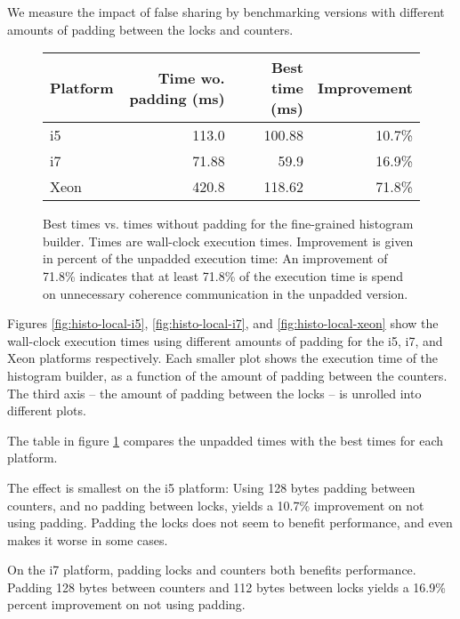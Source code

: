 We measure the impact of false sharing by benchmarking versions with different
amounts of padding between the locks and counters.


\begin{figure}[hbtp]
	\centering
	\begin{tabular}{l r r r}
		\hline
		\hline
		Platform & Time wo. padding (ms) & Best time (ms) & Improvement \\
		\hline
		i5 & 113.0 & 100.88 & 10.7\% \\
		i7 & 71.88 & 59.9 & 16.9\% \\
		Xeon & 420.8 & 118.62 & 71.8\% \\
		\hline
		\hline
	\end{tabular}
	\caption{Best times vs. times without padding for the fine-grained
	histogram builder. Times are wall-clock execution times. Improvement is
	given in percent of the unpadded execution time: An improvement of
	71.8\% indicates that at least 71.8\% of the execution time is spend on
	unnecessary coherence communication in the unpadded version.}
	\label{table:hist-local}
\end{figure}

Figures \ref{fig:histo-local-i5}, \ref{fig:histo-local-i7}, and
\ref{fig:histo-local-xeon} show the wall-clock execution times using different
amounts of padding for the i5, i7, and Xeon platforms respectively. Each smaller
plot shows the execution time of the histogram builder, as a function of the
amount of padding between the counters. The third axis -- the amount of padding
between the locks -- is unrolled into different plots.

The table in figure \ref{table:hist-local} compares the unpadded times with the
best times for each platform.

The effect is smallest on the i5 platform: Using 128 bytes padding between
counters, and no padding between locks, yields a 10.7\% improvement on not using
padding. Padding the locks does not seem to benefit performance, and even makes
it worse in some cases.

On the i7 platform, padding locks and counters both benefits performance.
Padding 128 bytes between counters and 112 bytes between locks yields a 16.9\%
percent improvement on not using padding.

